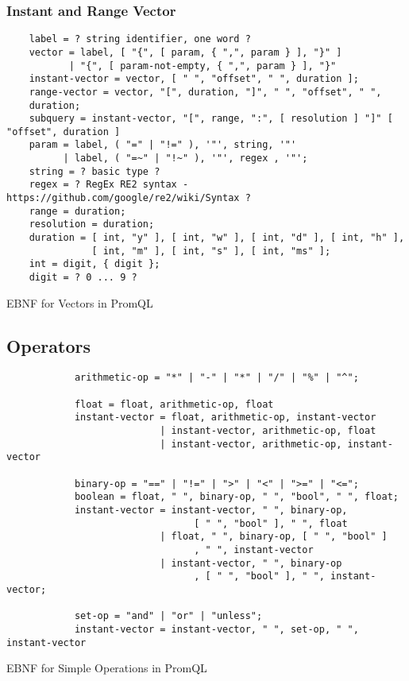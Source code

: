 \subsubsection{Instant and Range Vector}
\begin{listing}[H]
\begin{samepage}
\begin{verbatim}
	label = ? string identifier, one word ?
	vector = label, [ "{", [ param, { ",", param } ], "}" ]
	       | "{", [ param-not-empty, { ",", param } ], "}"
	instant-vector = vector, [ " ", "offset", " ", duration ];
	range-vector = vector, "[", duration, "]", " ", "offset", " ",
	duration;
	subquery = instant-vector, "[", range, ":", [ resolution ] "]" [ "offset", duration ]
	param = label, ( "=" | "!=" ), '"', string, '"'
	      | label, ( "=~" | "!~" ), '"', regex , '"';
	string = ? basic type ?
	regex = ? RegEx RE2 syntax - https://github.com/google/re2/wiki/Syntax ?
	range = duration;
	resolution = duration;
	duration = [ int, "y" ], [ int, "w" ], [ int, "d" ], [ int, "h" ], 
		       [ int, "m" ], [ int, "s" ], [ int, "ms" ];
	int = digit, { digit };
	digit = ? 0 ... 9 ?
\end{verbatim}
\caption{EBNF for Vectors in PromQL}
\label{lst:promql_vector}
\end{samepage}
\end{listing}

\subsection{Operators}

\begin{listing}[H]
	\begin{samepage}
		\begin{verbatim}
			arithmetic-op = "*" | "-" | "*" | "/" | "%" | "^";
			
			float = float, arithmetic-op, float
			instant-vector = float, arithmetic-op, instant-vector
			               | instant-vector, arithmetic-op, float
			               | instant-vector, arithmetic-op, instant-vector
			
			binary-op = "==" | "!=" | ">" | "<" | ">=" | "<=";
			boolean = float, " ", binary-op, " ", "bool", " ", float;
			instant-vector = instant-vector, " ", binary-op, 
			                     [ " ", "bool" ], " ", float
			               | float, " ", binary-op, [ " ", "bool" ]
			                     , " ", instant-vector
			               | instant-vector, " ", binary-op
			                     , [ " ", "bool" ], " ", instant-vector;
			
			set-op = "and" | "or" | "unless";
			instant-vector = instant-vector, " ", set-op, " ", instant-vector
		\end{verbatim}
		\caption{EBNF for Simple Operations in PromQL}
	\end{samepage}
\end{listing}


